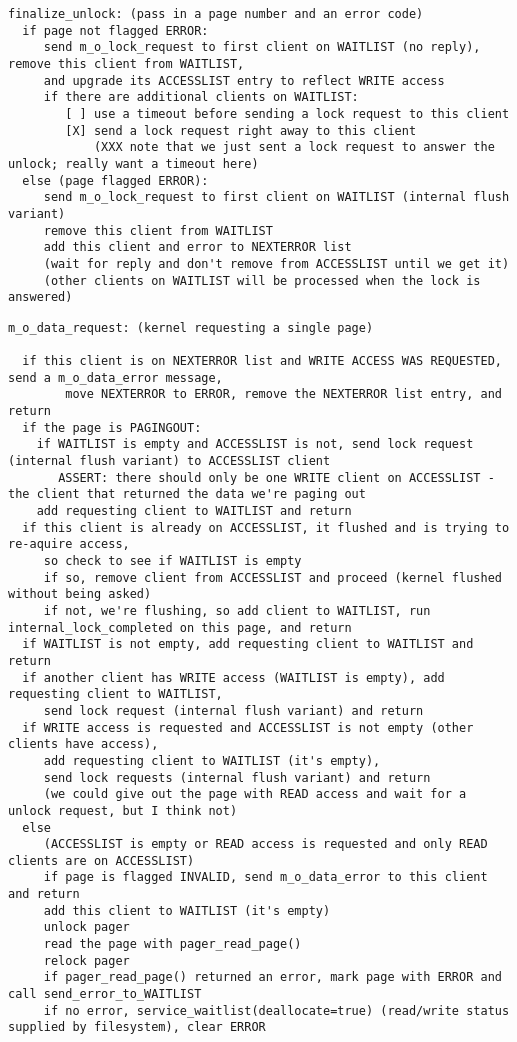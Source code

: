 \documentclass{article}
\begin{document}
\begin{verbatim}
finalize_unlock: (pass in a page number and an error code)
  if page not flagged ERROR:
     send m_o_lock_request to first client on WAITLIST (no reply), remove this client from WAITLIST,
     and upgrade its ACCESSLIST entry to reflect WRITE access
     if there are additional clients on WAITLIST:
        [ ] use a timeout before sending a lock request to this client
        [X] send a lock request right away to this client
            (XXX note that we just sent a lock request to answer the unlock; really want a timeout here)
  else (page flagged ERROR):
     send m_o_lock_request to first client on WAITLIST (internal flush variant)
     remove this client from WAITLIST
     add this client and error to NEXTERROR list
     (wait for reply and don't remove from ACCESSLIST until we get it)
     (other clients on WAITLIST will be processed when the lock is answered)
\end{verbatim}

\begin{verbatim}
m_o_data_request: (kernel requesting a single page)

  if this client is on NEXTERROR list and WRITE ACCESS WAS REQUESTED, send a m_o_data_error message,
        move NEXTERROR to ERROR, remove the NEXTERROR list entry, and return
  if the page is PAGINGOUT:
    if WAITLIST is empty and ACCESSLIST is not, send lock request (internal flush variant) to ACCESSLIST client
       ASSERT: there should only be one WRITE client on ACCESSLIST - the client that returned the data we're paging out
    add requesting client to WAITLIST and return
  if this client is already on ACCESSLIST, it flushed and is trying to re-aquire access,
     so check to see if WAITLIST is empty
     if so, remove client from ACCESSLIST and proceed (kernel flushed without being asked)
     if not, we're flushing, so add client to WAITLIST, run internal_lock_completed on this page, and return
  if WAITLIST is not empty, add requesting client to WAITLIST and return
  if another client has WRITE access (WAITLIST is empty), add requesting client to WAITLIST,
     send lock request (internal flush variant) and return
  if WRITE access is requested and ACCESSLIST is not empty (other clients have access),
     add requesting client to WAITLIST (it's empty),
     send lock requests (internal flush variant) and return
     (we could give out the page with READ access and wait for a unlock request, but I think not)
  else
     (ACCESSLIST is empty or READ access is requested and only READ clients are on ACCESSLIST)
     if page is flagged INVALID, send m_o_data_error to this client and return
     add this client to WAITLIST (it's empty)
     unlock pager
     read the page with pager_read_page()
     relock pager
     if pager_read_page() returned an error, mark page with ERROR and call send_error_to_WAITLIST
     if no error, service_waitlist(deallocate=true) (read/write status supplied by filesystem), clear ERROR
\end{verbatim}
\end{document}
